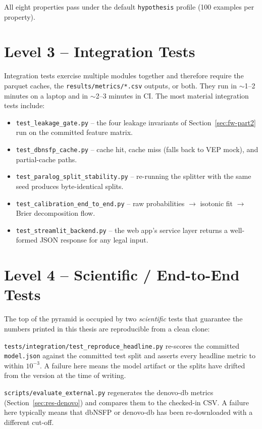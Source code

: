 \documentclass[11pt,a4paper,oneside]{report}
\begin{document}
All eight properties pass under the default
\texttt{hypothesis} profile (100 examples per property).

\section{Level 3 -- Integration Tests}
\label{sec:test-integration}

Integration tests exercise multiple modules together and
therefore require the parquet caches, the
\texttt{results/metrics/*.csv} outputs, or both. They run
in $\sim$1--2 minutes on a laptop and in $\sim$2--3 minutes
in CI. The most material integration tests include:

\begin{itemize}[leftmargin=1.6em, itemsep=0.15em]
\item \texttt{test\_leakage\_gate.py} -- the four leakage
  invariants of Section~\ref{sec:fw-part2} run on the
  committed feature matrix.
\item \texttt{test\_dbnsfp\_cache.py} -- cache hit, cache
  miss (falls back to VEP mock), and partial-cache paths.
\item \texttt{test\_paralog\_split\_stability.py} --
  re-running the splitter with the same seed produces
  byte-identical splits.
\item \texttt{test\_calibration\_end\_to\_end.py} -- raw
  probabilities $\to$ isotonic fit $\to$ Brier
  decomposition flow.
\item \texttt{test\_streamlit\_backend.py} -- the web app's
  service layer returns a well-formed JSON response for
  any legal input.
\end{itemize}

\section{Level 4 -- Scientific / End-to-End Tests}
\label{sec:test-e2e}

The top of the pyramid is occupied by two
\emph{scientific} tests that guarantee the numbers printed
in this thesis are reproducible from a clean clone:

\begin{description}[leftmargin=1.6em, itemsep=0.2em]
\item[reproduce-headline.]
  \texttt{tests/integration/test\_reproduce\_headline.py}
  re-scores the committed \texttt{model.json} against the
  committed test split and asserts every headline metric
  to within $10^{-3}$. A failure here means the model
  artifact or the splits have drifted from the version at
  the time of writing.
\item[reproduce-external.]
  \texttt{scripts/evaluate\_external.py} regenerates the
  denovo-db metrics (Section~\ref{sec:res-denovo}) and
  compares them to the checked-in CSV. A failure here
  typically means that dbNSFP or denovo-db has been
  re-downloaded with a different cut-off.
\end{description}
\end{document}
